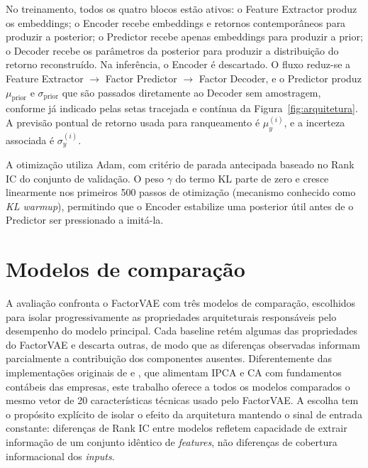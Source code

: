 No treinamento, todos os quatro blocos estão ativos: o Feature Extractor produz os
embeddings; o Encoder recebe embeddings e retornos contemporâneos para produzir a
posterior; o Predictor recebe apenas embeddings para produzir a prior; o Decoder recebe
os parâmetros da posterior para produzir a distribuição do retorno reconstruído. Na
inferência, o Encoder é descartado. O fluxo reduz-se a Feature Extractor $\to$ Factor
Predictor $\to$ Factor Decoder, e o Predictor produz $\mu_{\text{prior}}$ e
$\sigma_{\text{prior}}$ que são passados diretamente ao Decoder sem amostragem,
conforme já indicado pelas setas tracejada e contínua da Figura~\ref{fig:arquitetura}.
A previsão pontual de retorno usada para ranqueamento é $\mu_y^{(i)}$, e a incerteza
associada é $\sigma_y^{(i)}$.

A otimização utiliza Adam, com critério de parada antecipada baseado no Rank IC do
conjunto de validação. O peso $\gamma$ do termo KL parte de zero e cresce linearmente
nos primeiros 500 passos de otimização (mecanismo conhecido como \textit{KL warmup}),
permitindo que o Encoder estabilize uma posterior útil antes de o Predictor ser
pressionado a imitá-la.


\section{Modelos de comparação}
\label{sec:baselines}

A avaliação confronta o FactorVAE com três modelos de comparação, escolhidos para
isolar progressivamente as propriedades arquiteturais responsáveis pelo desempenho do
modelo principal. Cada baseline retém algumas das propriedades do FactorVAE e descarta
outras, de modo que as diferenças observadas informam parcialmente a contribuição dos
componentes ausentes. Diferentemente das implementações originais de
\textcite{kelly2019} e \textcite{gu2021}, que alimentam IPCA e CA com fundamentos
contábeis das empresas, este trabalho oferece a todos os modelos comparados o mesmo
vetor de 20 características técnicas usado pelo FactorVAE. A escolha tem o propósito
explícito de isolar o efeito da arquitetura mantendo o sinal de entrada constante:
diferenças de Rank IC entre modelos refletem capacidade de extrair informação de um
conjunto idêntico de \textit{features}, não diferenças de cobertura informacional dos
\textit{inputs}.

